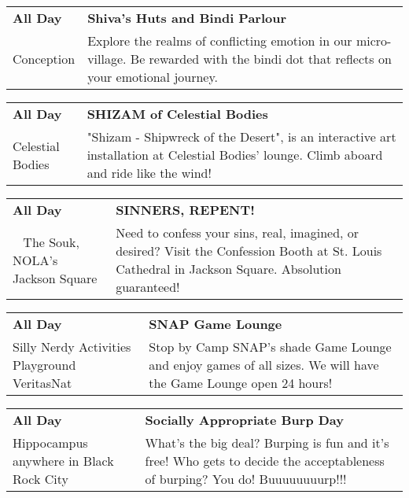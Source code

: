\begin{tabular}{ p{1in} p{2.2in} }
    \textbf{All Day} & \textbf{Shiva's Huts and Bindi Parlour} \\
    Conception \newline  & Explore the realms of conflicting emotion in our micro-village.  Be rewarded with the bindi dot that reflects on your emotional journey. \\
    \hline 
\end{tabular}
    
\begin{tabular}{ p{1in} p{2.2in} }
    \textbf{All Day} & \textbf{SHIZAM of Celestial Bodies} \\
    Celestial Bodies \newline  & "Shizam - Shipwreck of the Desert", is an interactive art installation at Celestial Bodies' lounge. Climb aboard and ride like the wind! \\
    \hline 
\end{tabular}
    
\begin{tabular}{ p{1in} p{2.2in} }
    \textbf{All Day} & \textbf{SINNERS, REPENT!} \\
    ~ \newline The Souk, NOLA's Jackson Square  & Need to confess your sins, real, imagined, or desired? Visit the Confession Booth at St. Louis Cathedral in Jackson Square. Absolution guaranteed! \\
    \hline 
\end{tabular}
    
\begin{tabular}{ p{1in} p{2.2in} }
    \textbf{All Day} & \textbf{SNAP Game Lounge} \\
    Silly Nerdy Activities Playground \newline VeritasNat & Stop by Camp SNAP's shade Game Lounge and enjoy games of all sizes. We will have the Game Lounge open 24 hours! \\
    \hline 
\end{tabular}
    
\begin{tabular}{ p{1in} p{2.2in} }
    \textbf{All Day} & \textbf{Socially Appropriate Burp Day} \\
    Hippocampus \newline anywhere in Black Rock City & What's the big deal? Burping is fun and it's free! Who gets to decide the acceptableness of burping? You do! Buuuuuuuurp!!! \\
    \hline 
\end{tabular}
    
